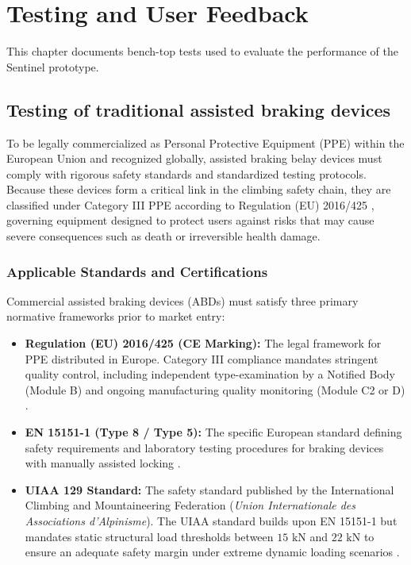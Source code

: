
\chapter{Testing and User Feedback}
\label{ch:testing-feedback}

This chapter documents bench-top tests used to evaluate the performance of the Sentinel prototype.

\section{Testing of traditional assisted braking devices}
\label{sec:testing-traditional-devices}

To be legally commercialized as Personal Protective Equipment (PPE) within the European Union and recognized globally, assisted braking belay devices must comply with rigorous safety standards and standardized testing protocols. Because these devices form a critical link in the climbing safety chain, they are classified under Category III PPE according to Regulation (EU) 2016/425 \cite{eu_ppe_2016}, governing equipment designed to protect users against risks that may cause severe consequences such as death or irreversible health damage.

\subsection{Applicable Standards and Certifications}

Commercial assisted braking devices (ABDs) must satisfy three primary normative frameworks prior to market entry:

\begin{itemize}
    \item \textbf{Regulation (EU) 2016/425 (CE Marking):} The legal framework for PPE distributed in Europe. Category III compliance mandates stringent quality control, including independent type-examination by a Notified Body (Module B) and ongoing manufacturing quality monitoring (Module C2 or D) \cite{eu_ppe_2016}.
    \item \textbf{EN 15151-1 (Type 8 / Type 5):} The specific European standard defining safety requirements and laboratory testing procedures for braking devices with manually assisted locking \cite{en15151_1}.
    \item \textbf{UIAA 129 Standard:} The safety standard published by the International Climbing and Mountaineering Federation (\textit{Union Internationale des Associations d'Alpinisme}). The UIAA standard builds upon EN 15151-1 but mandates static structural load thresholds between $15\text{ kN}$ and $22\text{ kN}$ to ensure an adequate safety margin under extreme dynamic loading scenarios \cite{uiaa129, TFM_Sentinel_2026}.
\end{itemize}

